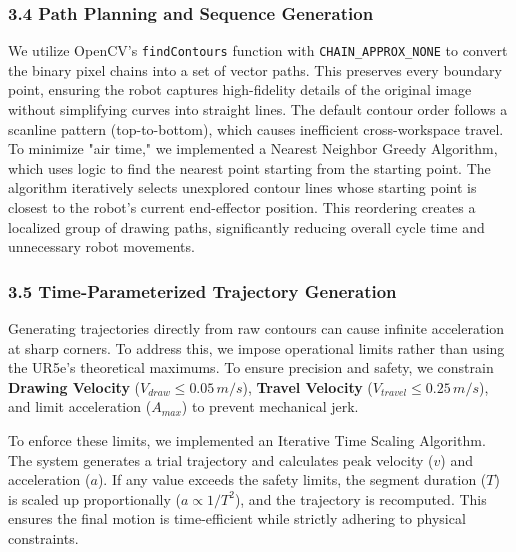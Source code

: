  \subsubsection{3.4 Path Planning and Sequence Generation}
We utilize OpenCV's \texttt{findContours} function with \texttt{CHAIN\_APPROX\_NONE} to convert the binary pixel chains into a set of vector paths. This preserves every boundary point, ensuring the robot captures high-fidelity details of the original image without simplifying curves into straight lines. The default contour order follows a scanline pattern (top-to-bottom), which causes inefficient cross-workspace travel. To minimize "air time," we implemented a Nearest Neighbor Greedy Algorithm, which uses logic to find the nearest point starting from the starting point. The algorithm iteratively selects unexplored contour lines whose starting point is closest to the robot's current end-effector position. This reordering creates a localized group of drawing paths, significantly reducing overall cycle time and unnecessary robot movements.

\subsubsection{3.5 Time-Parameterized Trajectory Generation}
Generating trajectories directly from raw contours can cause infinite acceleration at sharp corners. To address this, we impose operational limits rather than using the UR5e's theoretical maximums. To ensure precision and safety, we constrain \textbf{Drawing Velocity} ($V_{draw} \le 0.05 \, m/s$), \textbf{Travel Velocity} ($V_{travel} \le 0.25 \, m/s$), and limit acceleration ($A_{max}$) to prevent mechanical jerk.

To enforce these limits, we implemented an Iterative Time Scaling Algorithm. The system generates a trial trajectory and calculates peak velocity ($v$) and acceleration ($a$). If any value exceeds the safety limits, the segment duration ($T$) is scaled up proportionally ($a \propto 1/T^2$), and the trajectory is recomputed. This ensures the final motion is time-efficient while strictly adhering to physical constraints.

